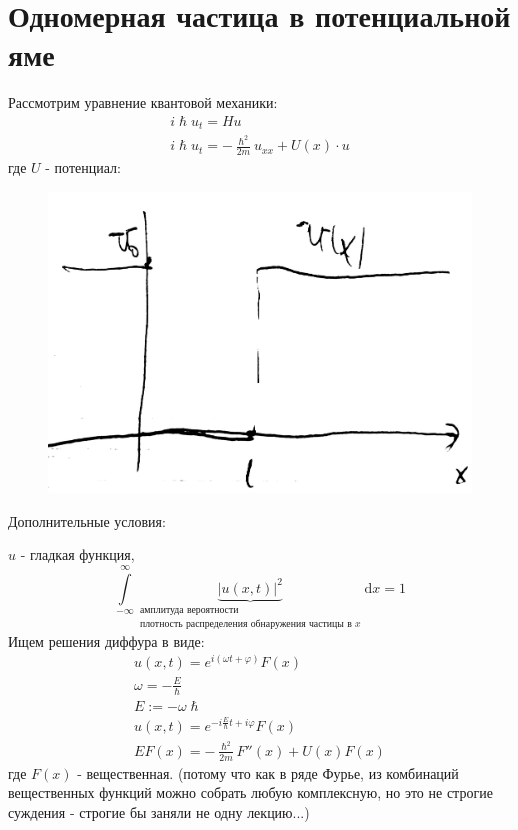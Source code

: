 \section{Одномерная частица в потенциальной яме}
Рассмотрим уравнение квантовой механики:
\[
	\begin{aligned}
	i \hslash u_t = Hu \\
	i \hslash u_t = -\frac{\hslash^2}{2m} u_{xx} + U(x) \cdot u
\end{aligned}
\]
где $U$ - потенциал:

\begin{figure}[H]
\includegraphics[width=\textwidth]{3}
\end{figure}

Дополнительные условия:

$u$ - гладкая функция,
\[
\int\limits_{-\infty}^\infty \underbrace{\left| u(x, t)\right|^2}_{\substack{\text{амплитуда вероятности} \\ \text{плотность распределения обнаружения частицы в }x}} \mathrm{d}x = 1
\]
Ищем решения диффура в виде:
\[
	\begin{aligned}
	u(x,t) = e^{i\left( \omega t + \varphi\right)} F(x) \\
	\omega = -\frac{E}{\hslash} \\
	E := -\omega \hslash \\
	u(x,t) = e ^{-i\frac{E}{\hslash} t + i \varphi} F(x) \\
	EF(x) = -\frac{\hslash^2}{2m} F''(x) + U(x) F(x)
	\end{aligned}
\]
где $F(x)$ - вещественная. (потому что как в ряде Фурье, из комбинаций вещественных функций можно собрать любую комплексную, но это не строгие суждения - строгие бы заняли не одну лекцию...)

